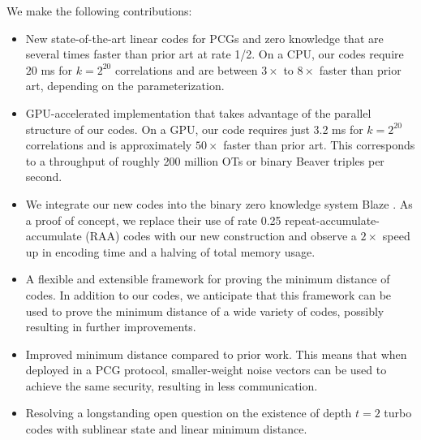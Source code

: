 We make the following contributions:
\begin{itemize}
    \item New state-of-the-art linear codes for PCGs and zero knowledge that are several times faster than prior art at rate 1/2. On a CPU, our codes require $20$ ms for $k=2^{20}$ correlations and are between $3\times$ to $8\times$ faster than prior art, depending on the parameterization.

    \item GPU-accelerated implementation that takes advantage of the parallel structure of our codes. On a GPU, our code requires just 3.2 ms for $k=2^{20}$ correlations and is approximately $50\times$ faster than prior art. This corresponds to a throughput of roughly 200 million OTs or binary Beaver triples per second.
    
    \item We integrate our new codes into the binary zero knowledge system Blaze \cite{blaze}. As a proof of concept, we replace their use of rate 0.25  repeat-accumulate-accumulate (RAA) codes with our new construction and observe a $2\times$ speed up in encoding time and a halving of total memory usage. 

    \item A flexible and extensible framework for proving the minimum distance of codes. In addition to our codes, we anticipate that this framework can be used to prove the minimum distance of a wide variety of codes, possibly resulting in further improvements.

    \item Improved minimum distance compared to prior work. This means that when deployed in a PCG protocol,  smaller-weight noise vectors can be used to achieve the same security, resulting in less communication. 
    \item Resolving a longstanding open question \cite{spielman,turbo} on the existence of depth $t=2$ turbo codes with sublinear state and linear minimum distance. 
\end{itemize}